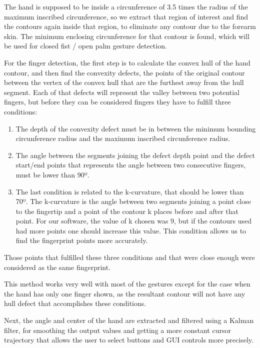The hand is supposed to be inside a circunference of 3.5 times the radius of the maximum inscribed circunference, so we extract that region of interest and find the contours again inside that region, to eliminate any contour due to the forearm skin. The minimum enclosing circunference for that contour is found, which will be used for closed fist / open palm gesture detection.

For the finger detection, the first step is to calculate the convex hull of the hand contour, and then find the convexity defects, the points of the original contour between the vertex of the convex hull that are the furthest away from the hull segment. Each of that defects will represent the valley between two potential fingers, but before they can be considered fingers they have to fulfill three conditions:

\begin{enumerate}
\item The depth of the convexity defect must be in between the minimum bounding circunference radius and the maximum inscribed circunference radius. 
\item The angle between the segments joining the defect depth point and the defect start/end points that represents the angle between two consecutive fingers, must be lower than 90º.
\item The last condition is related to the k-curvature, that should be lower than 70º. The k-curvature is the angle between two segments joining a point close to the fingertip and a point of the contour k places before and after that point. For our software, the value of k chosen was 9, but if the contours used had more points one should increase this value. This condition allows us to find the fingerprint points more accurately.
\end{enumerate}

Those points that fulfilled these three conditions and that were close enough were considered as the same fingerprint.

This method works very well with most of the gestures except for the case when the hand has only one finger shown, as the resultant contour will not have any hull defect that accomplishes these conditions.

Next, the angle and center of the hand are extracted and filtered using a Kalman filter, for smoothing the output values and getting a more constant cursor trajectory that allows the user to select buttons and GUI controls more precisely.

